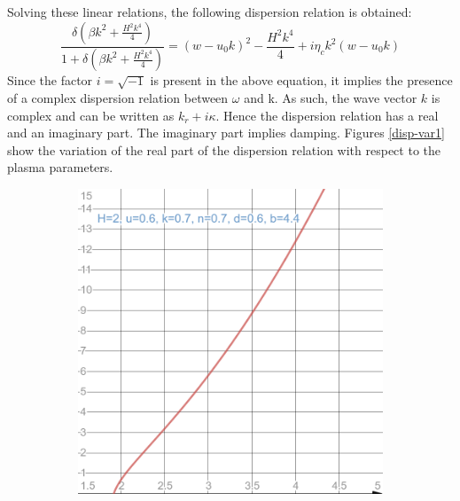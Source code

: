 \documentclass[a4paper, 12pt]{article}
\begin{document}
Solving these linear relations, the following dispersion relation is obtained:
\begin{equation}
\label{dispersion-final}
    \frac{\delta(\beta k^2 + \frac{H^2 k^4}{4})}{1 + \delta (\beta k^2 + \frac{H^2 k^4}{4})} = {(w - u_0 k)}^2 - \frac{H^2 k^4}{4} + i \eta_c k^2 (w - u_0 k)
\end{equation}
Since the factor $i=\sqrt{-1}$ is present in the above equation, it implies the presence of a complex dispersion relation between $\omega$ and k. As such, the wave vector $k$ is complex and can be written as $k_r + i\kappa$. Hence the dispersion relation has a real and an imaginary part. The imaginary part implies damping. Figures \ref{disp-var1} show the variation of the real part of the dispersion relation with respect to the plasma parameters.
\begin{figure}[t]
    \begin{subfigure}{0.5\textwidth}
    \centering
    \includegraphics[scale=0.2]{disp-real-base.png}
    \label{disp-real-base}
    \end{subfigure}
    \begin{subfigure}{0.5\textwidth}
    \centering

\end{subfigure}
\end{figure}
\end{document}
